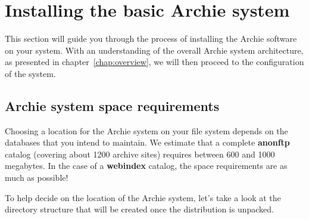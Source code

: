 %
%
%
%

\chapter{Installing the basic Archie system}
\label{chap:install}

This section will guide you through the process of installing the Archie
software on your system. With an understanding of the overall Archie system
architecture, as presented in chapter~\ref{chap:overview}, we will then proceed
to the configuration of the system.


\section{Archie system space requirements}


Choosing a location for the Archie system on your file system depends
on the databases that you intend to maintain. We estimate that a complete
{\bf anonftp} catalog (covering about 1200 archive sites) requires
between 600 and 1000 megabytes. In the case of a {\bf webindex} catalog,
the space requirements are as much as possible!  

To help decide on the location of the Archie system, let's take a look
at the directory structure that will be created once the distribution
is unpacked.

